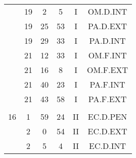 \documentclass[12pt, a4paper]{article}
\begin{document}
\begin{multicols}{3}
{\begin{tabular}{c c c c c c}
	 	 	 	 & 19 & 2 & 5 & I & OM.D.INT\\%
	 	 	 	 & 19 & 25 & 53 & I & PA.D.EXT\\%
	 	 	 	 & 19 & 29 & 33 & I & PA.D.INT\\%
	 	 	 	 & 21 & 12 & 33 & I & OM.F.INT\\%
	 	 	 	 & 21 & 16 & 8 & I & OM.F.EXT\\%
	 	 	 	 & 21 & 40 & 23 & I & PA.F.INT\\%
	 	 	 	 & 21 & 43 & 58 & I & PA.F.EXT\\%
	 	 	 	 & & & & & \\%
	 	 	 	16 & 1 & 59 & 24 & II & EC.D.PEN\\%
	 	 	 	 & 2 & 0 & 54 & II & EC.D.EXT\\%
	 	 	 	 & 2 & 5 & 4 & II & EC.D.INT\\%
	 	 \end{tabular}
 	}
\end{multicols}
\end{document}
